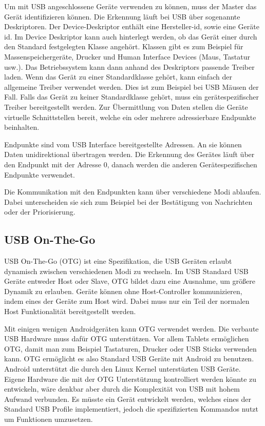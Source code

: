 \documentclass[12pt,journal,compsoc]{IEEEtran}
\begin{document}
Um mit USB angeschlossene Geräte verwenden zu können, muss der Master das Gerät identifizieren können. 
Die Erkennung läuft bei USB über sogenannte Deskriptoren. 
Der Device-Deskriptor enthält eine Hersteller-id, sowie eine Geräte id.
Im Device Deskriptor kann auch hinterlegt werden, ob das Gerät einer durch den Standard festgelegten Klasse angehört. 
Klassen gibt es zum Beispiel für Massenspeichergeräte, Drucker und Human Interface Devices (Maus, Tastatur usw.).
Das Betriebssystem kann dann anhand des Deskriptors passende Treiber laden. Wenn das Gerät zu einer Standardklasse gehört, kann einfach der allgemeine Treiber verwendet werden. Dies ist zum Beispiel bei USB Mäusen der Fall.
Falls das Gerät zu keiner Standardklasse gehört, muss ein gerätespezifischer Treiber bereitgestellt werden.
Zur Übermittlung von Daten stellen die Geräte virtuelle Schnittstellen bereit, welche ein oder mehrere adressierbare Endpunkte beinhalten. 

Endpunkte sind vom USB Interface bereitgestellte Adressen. An sie können Daten unidirektional übertragen werden.
Die Erkennung des Gerätes läuft über den Endpunkt mit der Adresse 0, danach werden die anderen Gerätespezifischen Endpunkte verwendet.

Die Kommunikation mit den Endpunkten kann über verschiedene Modi ablaufen.
Dabei unterscheiden sie sich zum Beispiel bei der Bestätigung von Nachrichten oder der Priorisierung.  

\subsection{USB On-The-Go}
USB On-The-Go (OTG) ist eine Spezifikation, die USB Geräten erlaubt dynamisch zwischen verschiedenen Modi zu wechseln. 
Im USB Standard USB Geräte entweder Host oder Slave, OTG bildet dazu eine Ausnahme, um größere Dynamik zu erlauben.
Geräte können ohne Host-Controller kommunizieren, indem eines der Geräte zum Host wird.
Dabei muss nur ein Teil der normalen Host Funktionalität bereitgestellt werden.

Mit einigen wenigen Androidgeräten kann OTG verwendet werden. Die verbaute USB Hardware muss dafür OTG unterstützen.
Vor allem Tablets ermöglichen OTG, damit man zum Beispiel Tastaturen, Drucker oder USB Sticks verwenden kann.
OTG ermöglicht es also Standard USB Geräte mit Android zu benutzen. Android unterstützt die durch den Linux Kernel unterstüzten USB Geräte. Eigene Hardware die mit der OTG Unterstützung kontrolliert werden könnte zu entwickeln, wäre denkbar aber durch die Komplexität von USB mit hohem Aufwand verbunden.
Es müsste ein Gerät entwickelt werden, welches eines der Standard USB Profile implementiert, jedoch die spezifizierten Kommandos nutzt um Funktionen umzusetzen.
\end{document}
